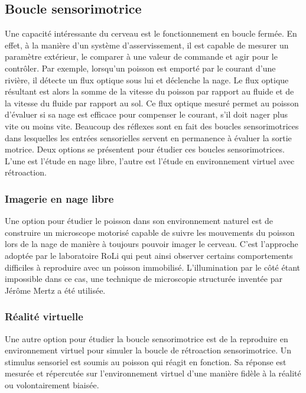 
\subsection{Boucle sensorimotrice}

Une capacité intéressante du cerveau est le fonctionnement en boucle fermée. En effet, à la manière d'un système d'asservissement, il est capable de mesurer un paramètre extérieur, le comparer à une valeur de commande et agir pour le contrôler. Par exemple, lorsqu'un poisson est emporté par le courant d'une rivière, il détecte un flux optique sous lui et déclenche la nage. Le flux optique résultant est alors la somme de la vitesse du poisson par rapport au fluide et de la vitesse du fluide par rapport au sol. Ce flux optique mesuré permet au poisson d'évaluer si sa nage est efficace pour compenser le courant, s'il doit nager plus vite ou moins vite. Beaucoup des réflexes sont en fait des boucles sensorimotrices dans lesquelles les entrées sensorielles servent en permanence à évaluer la sortie motrice. Deux options se présentent pour étudier ces boucles sensorimotrices. L'une est l'étude en nage libre, l'autre est l'étude en environnement virtuel avec rétroaction.

\subsubsection{Imagerie en nage libre}

Une option pour étudier le poisson dans son environnement naturel est de construire un microscope motorisé capable de suivre les mouvements du poisson lors de la nage de manière à toujours pouvoir imager le cerveau. C'est l'approche adoptée par le laboratoire RoLi \cite{kim_pan-neuronal_2017} qui peut ainsi observer certains comportements difficiles à reproduire avec un poisson immobilisé. L'illumination par le côté étant impossible dans ce cas, une technique de microscopie structurée inventée par Jérôme Mertz \cite{mertz_optical_2011} a été utilisée.


\subsubsection{Réalité virtuelle}

Une autre option pour étudier la boucle sensorimotrice est de la reproduire en environnement virtuel pour simuler la boucle de rétroaction sensorimotrice. Un stimulus sensoriel est soumis au poisson qui réagit en fonction. Sa réponse est mesurée et répercutée sur l'environnement virtuel d'une manière fidèle à la réalité ou volontairement biaisée.

